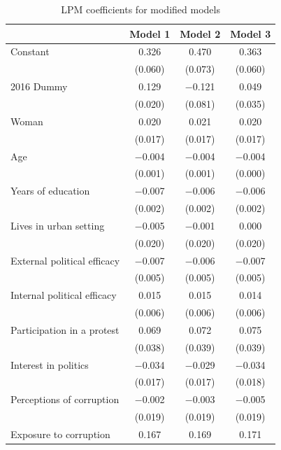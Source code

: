 \documentclass[12pt,a4]{article}\usepackage[]{graphicx}\usepackage[]{xcolor}
\begin{document}
\begin{table}[htbp]
\begin{center}
\caption{LPM coefficients for modified models}
\label{tab:complexmodlpm}

\begin{tabular}[t]{lccc}
\toprule
  & Model 1 & Model 2 & Model 3\\
\midrule
Constant & \num{0.326} & \num{0.470} & \num{0.363}\\
 & (\num{0.060}) & (\num{0.073}) & (\num{0.060})\\
2016 Dummy & \num{0.129} & \num{-0.121} & \num{0.049}\\
 & (\num{0.020}) & (\num{0.081}) & (\num{0.035})\\
Woman & \num{0.020} & \num{0.021} & \num{0.020}\\
 & (\num{0.017}) & (\num{0.017}) & (\num{0.017})\\
Age & \num{-0.004} & \num{-0.004} & \num{-0.004}\\
 & (\num{0.001}) & (\num{0.001}) & (\num{0.000})\\
Years of education & \num{-0.007} & \num{-0.006} & \num{-0.006}\\
 & (\num{0.002}) & (\num{0.002}) & (\num{0.002})\\
Lives in urban setting & \num{-0.005} & \num{-0.001} & \num{0.000}\\
 & (\num{0.020}) & (\num{0.020}) & (\num{0.020})\\
External political efficacy & \num{-0.007} & \num{-0.006} & \num{-0.007}\\
 & (\num{0.005}) & (\num{0.005}) & (\num{0.005})\\
Internal political efficacy & \num{0.015} & \num{0.015} & \num{0.014}\\
 & (\num{0.006}) & (\num{0.006}) & (\num{0.006})\\
Participation in a protest & \num{0.069} & \num{0.072} & \num{0.075}\\
 & (\num{0.038}) & (\num{0.039}) & (\num{0.039})\\
Interest in politics & \num{-0.034} & \num{-0.029} & \num{-0.034}\\
 & (\num{0.017}) & (\num{0.017}) & (\num{0.018})\\
Perceptions of corruption & \num{-0.002} & \num{-0.003} & \num{-0.005}\\
 & (\num{0.019}) & (\num{0.019}) & (\num{0.019})\\
Exposure to corruption & \num{0.167} & \num{0.169} & \num{0.171}\\

\end{tabular}
\end{center}
\end{table}
\end{document}
